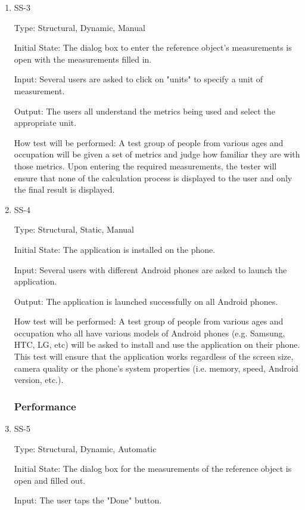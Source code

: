 \documentclass[12pt, titlepage]{article}
\begin{document}
\begin{enumerate}
\item{SS-3\\}

Type: Structural, Dynamic, Manual

Initial State: The dialog box to enter the reference object's measurements is open with the measurements filled in.

Input: Several users are asked to click on "units" to specify a unit of measurement.

Output: The users all understand the metrics being used and select the appropriate unit.

How test will be performed: A test group of people from various ages and occupation will be given a set of metrics and judge how familiar they are with those metrics. Upon entering the required measurements, the tester will ensure that none of the calculation process is displayed to the user and only the final result is displayed.

\item{SS-4\\}

Type: Structural, Static, Manual

Initial State: The application is installed on the phone.

Input: Several users with different Android phones are asked to launch the application.

Output: The application is launched successfully on all Android phones.

How test will be performed: A test group of people from various ages and occupation who all have various models of Android phones (e.g. Samsung, HTC, LG, etc) will be asked to install and use the application on their phone. This test will ensure that the application works regardless of the screen size, camera quality or the phone's system properties (i.e. memory, speed, Android version, etc.).

\subsubsection{Performance}
\item{SS-5\\}

Type: Structural, Dynamic, Automatic

Initial State: The dialog box for the measurements of the reference object is open and filled out.

Input: The user taps the "Done" button.


\end{enumerate}
\end{document}
